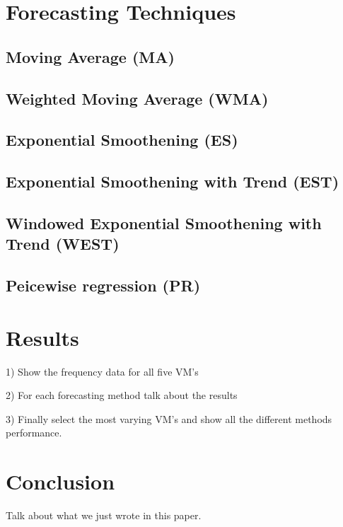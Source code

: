 \documentclass[conference,onecolumn]{IEEEtran}
\begin{document}
\section{Forecasting Techniques}


\subsection{Moving Average (MA)}

\subsection{Weighted Moving Average (WMA)}

\subsection{Exponential Smoothening (ES)}

\subsection{Exponential Smoothening with Trend (EST)}

\subsection{Windowed Exponential Smoothening with Trend (WEST)}

\subsection{Peicewise regression (PR)}

\section{Results}

1) Show the frequency data for all five VM's

2) For each forecasting method talk about the results

3) Finally select the most varying VM's and show all the different methods performance.

\section{Conclusion}

Talk about what we just wrote in this paper.

\ifCLASSOPTIONcaptionsoff
  \newpage
\fi
\end{document}

